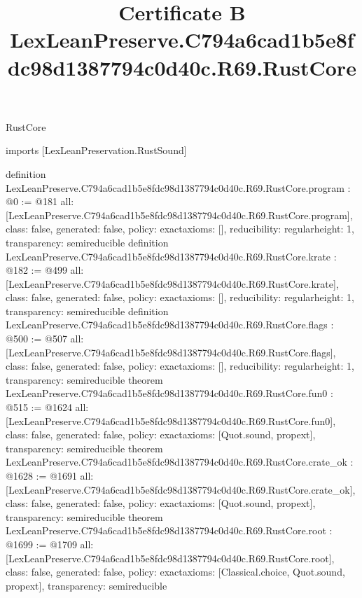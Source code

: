 \begin{lexlean}{RustCore}
\title{Certificate B LexLeanPreserve.C794a6cad1b5e8fdc98d1387794c0d40c.R69.RustCore}
\begin{coremodule}
imports [LexLeanPreservation.RustSound]

definition LexLeanPreserve.C794a6cad1b5e8fdc98d1387794c0d40c.R69.RustCore.program : @0 := @181 {
  all: [LexLeanPreserve.C794a6cad1b5e8fdc98d1387794c0d40c.R69.RustCore.program],
  class: false,
  generated: false,
  policy: exact{axioms: []},
  reducibility: regular{height: 1},
  transparency: semireducible
}
definition LexLeanPreserve.C794a6cad1b5e8fdc98d1387794c0d40c.R69.RustCore.krate : @182 := @499 {
  all: [LexLeanPreserve.C794a6cad1b5e8fdc98d1387794c0d40c.R69.RustCore.krate],
  class: false,
  generated: false,
  policy: exact{axioms: []},
  reducibility: regular{height: 1},
  transparency: semireducible
}
definition LexLeanPreserve.C794a6cad1b5e8fdc98d1387794c0d40c.R69.RustCore.flags : @500 := @507 {
  all: [LexLeanPreserve.C794a6cad1b5e8fdc98d1387794c0d40c.R69.RustCore.flags],
  class: false,
  generated: false,
  policy: exact{axioms: []},
  reducibility: regular{height: 1},
  transparency: semireducible
}
theorem LexLeanPreserve.C794a6cad1b5e8fdc98d1387794c0d40c.R69.RustCore.fun0 : @515 := @1624 {
  all: [LexLeanPreserve.C794a6cad1b5e8fdc98d1387794c0d40c.R69.RustCore.fun0],
  class: false,
  generated: false,
  policy: exact{axioms: [Quot.sound, propext]},
  transparency: semireducible
}
theorem LexLeanPreserve.C794a6cad1b5e8fdc98d1387794c0d40c.R69.RustCore.crate_ok : @1628 := @1691 {
  all: [LexLeanPreserve.C794a6cad1b5e8fdc98d1387794c0d40c.R69.RustCore.crate_ok],
  class: false,
  generated: false,
  policy: exact{axioms: [Quot.sound, propext]},
  transparency: semireducible
}
theorem LexLeanPreserve.C794a6cad1b5e8fdc98d1387794c0d40c.R69.RustCore.root : @1699 := @1709 {
  all: [LexLeanPreserve.C794a6cad1b5e8fdc98d1387794c0d40c.R69.RustCore.root],
  class: false,
  generated: false,
  policy: exact{axioms: [Classical.choice, Quot.sound, propext]},
  transparency: semireducible
}


\end{coremodule}
\end{lexlean}
